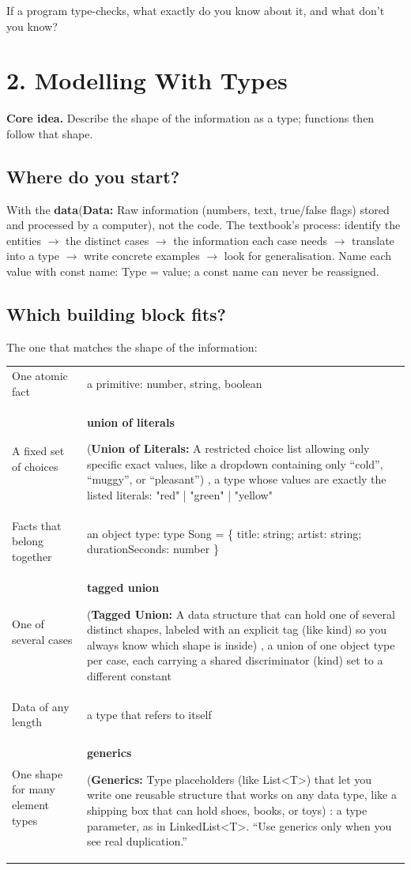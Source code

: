 \documentclass[10pt]{article}
\newcommand{\code}[1]{{\ttfamily\small #1}}
\newcommand{\term}[3][]{%
  \hypertarget{t:#2}{\textbf{#3}}%
  \if\relax\detokenize{#1}\relax\else%
    {\thinspace\footnotesize\color{black!65}(#1)}%
  \fi%
}
\renewcommand{\footnote}[1]{{\thinspace\footnotesize\color{black!65}(#1)}}
\newcommand{\chap}[2]{\section*{#1}\addcontentsline{toc}{section}{#1}\vspace{-2pt}\begin{corebox}\textbf{Core idea.} #2\end{corebox}}
\begin{document}
\begin{ponder}
If a program type-checks, what exactly do you know about it, and what don't you know?
\end{ponder}

\chap{2. Modelling With Types}{Describe the shape of the information as a type; functions then follow that shape.}

\subsection{Where do you start?}
With the \textbf{data}\footnote{\textbf{Data:} Raw information (numbers, text, true/false flags) stored and processed by a computer}, not the code. The textbook's process: identify the entities $\to$ the distinct cases $\to$ the information each case needs $\to$ translate into a type $\to$ write concrete examples $\to$ look for generalisation. Name each value with \code{const name: Type = value}; a \code{const} name can never be reassigned.

\subsection{Which building block fits?}
The one that matches the shape of the information:

\begin{tabularx}{\linewidth}{@{}lX@{}}
\toprule
One atomic fact & a primitive: \code{number}, \code{string}, \code{boolean} \\
A fixed set of choices & \term[\textbf{Union of Literals:} A restricted choice list allowing only specific exact values, like a dropdown containing only ``cold'', ``muggy'', or ``pleasant'']{literalunion}{union of literals}, a type whose values are exactly the listed literals: \code{"red" | "green" | "yellow"} \\
Facts that belong together & an object type: \code{type Song = \{ title: string; artist: string; durationSeconds: number \}} \\
One of several cases & \term[\textbf{Tagged Union:} A data structure that can hold one of several distinct shapes, labeled with an explicit tag (like kind) so you always know which shape is inside]{taggedunion}{tagged union}, a union of one object type per case, each carrying a shared discriminator (\code{kind}) set to a different constant \\
Data of any length & a type that refers to itself \\
One shape for many element types & \term[\textbf{Generics:} Type placeholders (like List<T>) that let you write one reusable structure that works on any data type, like a shipping box that can hold shoes, books, or toys]{generics}{generics}: a type parameter, as in \code{LinkedList<T>}. ``Use generics only when you see real duplication.'' \\ \bottomrule
\end{tabularx}
\end{document}
